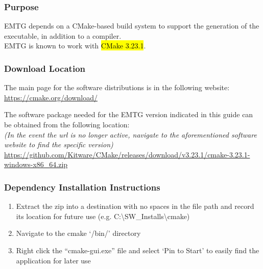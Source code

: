
\subsubsection{Purpose}
\noindent \ac{EMTG} depends on a CMake-based build system to support the generation of the executable, in addition to a compiler. \\ \ac{EMTG} is known to work with \hl{CMake 3.23.1}.

\subsubsection{Download Location}
\noindent The main page for the software distributions is in the following website: \\
\url{https://cmake.org/download/}

\noindent The software package needed for the EMTG version indicated in this guide can be obtained from the following location: \\
\emph{(In the event the url is no longer active, navigate to the aforementioned software website to find the specific version)} \\
\url{https://github.com/Kitware/CMake/releases/download/v3.23.1/cmake-3.23.1-windows-x86_64.zip}

\subsubsection{Dependency Installation Instructions}
\begin{enumerate}
	\item Extract the zip into a destination with no spaces in the file path and record its location for future use (e.g. C:\textbackslash SW\_Installs\textbackslash cmake)
	\item Navigate to the cmake ‘/bin/’ directory
	\item Right click the “cmake-gui.exe” file and select ‘Pin to Start’ to easily find the application for later use
\end{enumerate}
